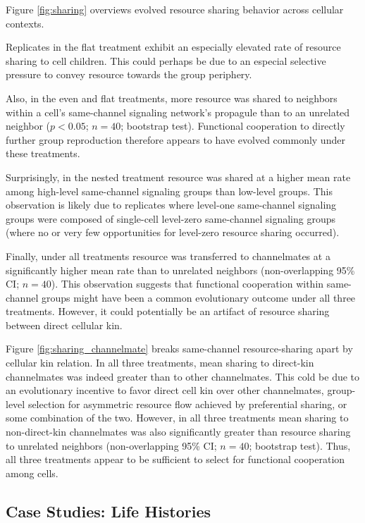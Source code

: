 


Figure \ref{fig:sharing} overviews evolved resource sharing behavior across cellular contexts.

Replicates in the flat treatment exhibit an especially elevated rate of resource sharing to cell children.
This could perhaps be due to an especial selective pressure to convey resource towards the group periphery.

Also, in the even and flat treatments, more resource was shared to neighbors within a cell's same-channel signaling network's propagule than to an unrelated neighbor ($p < 0.05$; $n=40$; bootstrap test).
Functional cooperation to directly further group reproduction therefore appears to have evolved commonly under these treatments.

Surprisingly, in the nested treatment resource was shared at a higher mean rate among high-level same-channel signaling groups than low-level groups.
This observation is likely due to replicates where level-one same-channel signaling groups were composed of single-cell level-zero same-channel signaling groups (where no or very few opportunities for level-zero resource sharing occurred).

Finally, under all treatments resource was transferred to channelmates at a significantly higher mean rate than to unrelated neighbors (non-overlapping 95\% CI; $n=40$).
This observation suggests that functional cooperation within same-channel groups might have been a common evolutionary outcome under all three treatments.
However, it could potentially be an artifact of resource sharing between direct cellular kin.

Figure \ref{fig:sharing_channelmate} breaks same-channel resource-sharing apart by cellular kin relation.
In all three treatments, mean sharing to direct-kin channelmates was indeed greater than to other channelmates.
This cold be due to an evolutionary incentive to favor direct cell kin over other channelmates, group-level selection for asymmetric resource flow achieved by preferential sharing, or some combination of the two.
However, in all three treatments mean sharing to non-direct-kin channelmates was also significantly greater than resource sharing to unrelated neighbors (non-overlapping 95\% CI; $n=40$; bootstrap test).
Thus, all three treatments appear to be sufficient to select for functional cooperation among cells.

\subsection{Case Studies: Life Histories} \label{sec:life-histories}

